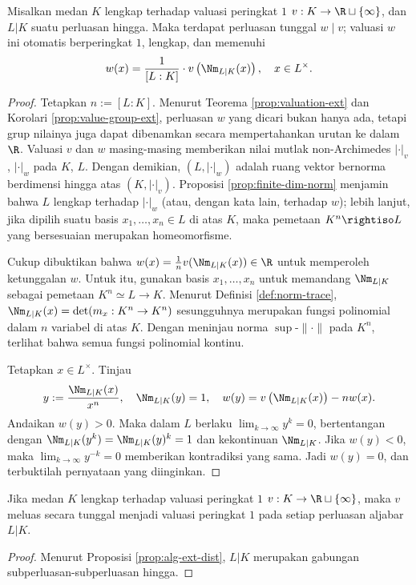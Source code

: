 \begin{theorem}\label{prop:valuation-ext-complete}
	Misalkan medan $K$ lengkap terhadap valuasi peringkat $1$ $v: K \to \R \sqcup \{\infty\}$, dan $L|K$ suatu perluasan hingga. Maka terdapat perluasan tunggal $w \mid v$; valuasi $w$ ini otomatis berperingkat $1$, lengkap, dan memenuhi
	\[ w(x) = \frac{1}{[L:K]} \cdot v\left(\Nm_{L|K}(x)\right), \quad x \in L^\times. \]
\end{theorem}
\begin{proof}
	Tetapkan $n := [L:K]$. Menurut Teorema \ref{prop:valuation-ext} dan Korolari \ref{prop:value-group-ext}, perluasan $w$ yang dicari bukan hanya ada, tetapi grup nilainya juga dapat dibenamkan secara mempertahankan urutan ke dalam $\R$. Valuasi $v$ dan $w$ masing-masing memberikan nilai mutlak non-Archimedes $|\cdot|_v$, $|\cdot|_w$ pada $K$, $L$. Dengan demikian, $(L, |\cdot|_w)$ adalah ruang vektor bernorma berdimensi hingga atas $(K, |\cdot|_v)$. Proposisi \ref{prop:finite-dim-norm} menjamin bahwa $L$ lengkap terhadap $|\cdot|_w$ (atau, dengan kata lain, terhadap $w$); lebih lanjut, jika dipilih suatu basis $x_1, \ldots, x_n \in L$ di atas $K$, maka pemetaan $K^n \rightiso L$ yang bersesuaian merupakan homeomorfisme.

	Cukup dibuktikan bahwa $w(x) = \frac{1}{n} v(\Nm_{L|K}(x)) \in \R$ untuk memperoleh ketunggalan $w$. Untuk itu, gunakan basis $x_1, \ldots, x_n$ untuk memandang $\Nm_{L|K}$ sebagai pemetaan $K^n \simeq L \to K$. Menurut Definisi \ref{def:norm-trace}, $\Nm_{L|K}(x) = \det(m_x: K^n \to K^n)$ sesungguhnya merupakan fungsi polinomial dalam $n$ variabel di atas $K$. Dengan meninjau norma $\sup\text{-}\|\cdot\|$ pada $K^n$, terlihat bahwa semua fungsi polinomial kontinu.
	
	Tetapkan $x \in L^\times$. Tinjau
	\[ y := \frac{\Nm_{L|K}(x)}{x^n}, \quad \Nm_{L|K}(y)=1, \quad w(y) = v \left( \Nm_{L|K}(x) \right) - n w(x). \]
	Andaikan $w(y) > 0$. Maka dalam $L$ berlaku $\lim_{k \to \infty} y^k = 0$, bertentangan dengan $\Nm_{L|K}(y^k) = \Nm_{L|K}(y)^k = 1$ dan kekontinuan $\Nm_{L|K}$. Jika $w(y) < 0$, maka $\lim_{k \to \infty} y^{-k} = 0$ memberikan kontradiksi yang sama. Jadi $w(y)=0$, dan terbuktilah pernyataan yang diinginkan.
\end{proof}

\begin{corollary}\label{prop:valuation-ext-complete-alg}
	Jika medan $K$ lengkap terhadap valuasi peringkat $1$ $v: K \to \R \sqcup \{\infty\}$, maka $v$ meluas secara tunggal menjadi valuasi peringkat $1$ pada setiap perluasan aljabar $L|K$.
\end{corollary}
\begin{proof}
	Menurut Proposisi \ref{prop:alg-ext-dist}, $L|K$ merupakan gabungan subperluasan-subperluasan hingga.
\end{proof}

